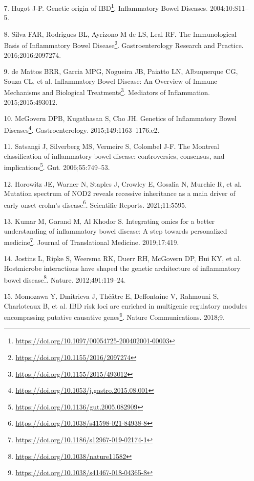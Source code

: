 \documentclass[
  a4paper,
]{book}
\DeclareRobustCommand{\href}[2]{#2\footnote{\url{#1}}}
\newlength{\cslhangindent}
\newlength{\cslentryspacingunit} %
\newenvironment{CSLReferences}[2] %
 {%
  \setlength{\parindent}{0pt}
  \ifodd #1
  \let\oldpar\par
  \def\par{\hangindent=\cslhangindent\oldpar}
  \fi
  \setlength{\parskip}{#2\cslentryspacingunit}
 }%
 {}
\begin{document}
\begin{CSLReferences}{0}{0}
\leavevmode{}%
7. Hugot J-P. \href{https://doi.org/10.1097/00054725-200402001-00003}{Genetic origin of IBD}. Inflammatory Bowel Diseases. 2004;10:S11--5.

\leavevmode{}%
8. Silva FAR, Rodrigues BL, Ayrizono M de LS, Leal RF. \href{https://doi.org/10.1155/2016/2097274}{The Immunological Basis of Inflammatory Bowel Disease}. Gastroenterology Research and Practice. 2016;2016:2097274.

\leavevmode{}%
9. de Mattos BRR, Garcia MPG, Nogueira JB, Paiatto LN, Albuquerque CG, Souza CL, et al. \href{https://doi.org/10.1155/2015/493012}{Inflammatory Bowel Disease: An Overview of Immune Mechanisms and Biological Treatments}. Mediators of Inflammation. 2015;2015:493012.

\leavevmode{}%
10. McGovern DPB, Kugathasan S, Cho JH. \href{https://doi.org/10.1053/j.gastro.2015.08.001}{Genetics of Inflammatory Bowel Diseases}. Gastroenterology. 2015;149:1163--1176.e2.

\leavevmode{}%
11. Satsangi J, Silverberg MS, Vermeire S, Colombel J-F. \href{https://doi.org/10.1136/gut.2005.082909}{The Montreal classification of inflammatory bowel disease: controversies, consensus, and implications}. Gut. 2006;55:749--53.

\leavevmode{}%
12. Horowitz JE, Warner N, Staples J, Crowley E, Gosalia N, Murchie R, et al. \href{https://doi.org/10.1038/s41598-021-84938-8}{Mutation spectrum of NOD2 reveals recessive inheritance as a main driver of early onset crohn{'}s disease}. Scientific Reports. 2021;11:5595.

\leavevmode{}%
13. Kumar M, Garand M, Al Khodor S. \href{https://doi.org/10.1186/s12967-019-02174-1}{Integrating omics for a better understanding of inflammatory bowel disease: A step towards personalized medicine}. Journal of Translational Medicine. 2019;17:419.

\leavevmode{}%
14. Jostins L, Ripke S, Weersma RK, Duerr RH, McGovern DP, Hui KY, et al. \href{https://doi.org/10.1038/nature11582}{Host{\textendash}microbe interactions have shaped the genetic architecture of inflammatory bowel disease}. Nature. 2012;491:119--24.

\leavevmode{}%
15. Momozawa Y, Dmitrieva J, Théâtre E, Deffontaine V, Rahmouni S, Charloteaux B, et al. \href{https://doi.org/10.1038/s41467-018-04365-8}{IBD risk loci are enriched in multigenic regulatory modules encompassing putative causative genes}. Nature Communications. 2018;9.


\end{CSLReferences}
\end{document}
